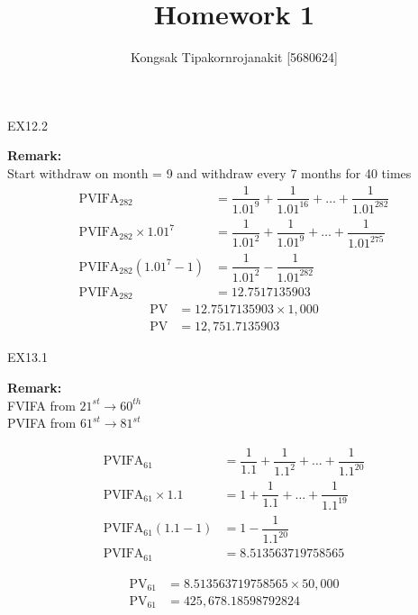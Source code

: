 \documentclass{article}
\begin{document}
	\title{Homework 1}
	\author{Kongsak Tipakornrojanakit [5680624]}
	\date{}
	\maketitle
	
	EX12.2
	
	
	\textbf{Remark:} \\
	
	Start withdraw on month = 9 and withdraw every 7 months for 40 times
	\begin{align*}
		\mbox{PVIFA}_{282} &= \dfrac{1}{1.01^9} + \dfrac{1}{1.01^{16}} + \dots + \dfrac{1}{1.01^{282}} \\
		\mbox{PVIFA}_{282} \times 1.01^7 &= \dfrac{1}{1.01^2} + \dfrac{1}{1.01^{9}} + \dots + \dfrac{1}{1.01^{275}} \\ 
		\mbox{PVIFA}_{282} (1.01^7 - 1) &= \dfrac{1}{1.01^2} - \dfrac{1}{1.01^{282}} \\
		\mbox{PVIFA}_{282} &= 12.7517135903
	\end{align*}
	\vspace{0.1in}
	\begin{align*}	
		\mbox{PV} &= 12.7517135903 \times 1,000 \\
		\mbox{PV} &= 12,751.7135903
	\end{align*}
	
	\newpage
	EX13.1
	
	
	\textbf{Remark:} \\
	
	FVIFA from $21^{st} \rightarrow 60^{th} $ \\
	\indent PVIFA from $61^{st} \rightarrow 81^{st} $
	
	\begin{align*}
	\mbox{PVIFA}_{61} &= \dfrac{1}{1.1} + \dfrac{1}{1.1^{2}} + \dots + \dfrac{1}{1.1^{20}} \\
	\mbox{PVIFA}_{61} \times 1.1 &= 1 + \dfrac{1}{1.1} + \dots + \dfrac{1}{1.1^{19}} \\ 
	\mbox{PVIFA}_{61} (1.1 - 1) &= 1 - \dfrac{1}{1.1^{20}} \\
	\mbox{PVIFA}_{61} &= 8.513563719758565
	\end{align*}
	
	\vspace{0.1in}
	\begin{align*}	
	\mbox{PV}_{61} &= 8.513563719758565 \times 50,000 \\
	\mbox{PV}_{61} &= 425,678.18598792824
	\end{align*}
	
\end{document}
